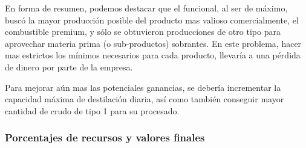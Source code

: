 \documentclass[a4paper,10pt]{article}
\begin{document}
En forma de resumen, podemos destacar que el funcional, al ser de m\'aximo, busc\'o la mayor producci\'on posible del producto mas valioso comercialmente, el combustible premium, y s\'olo se obtuvieron producciones de otro tipo para aprovechar materia prima (o sub-productos) sobrantes. En este problema, hacer mas estrictos los m\'inimos necesarios para cada producto, llevar\'ia a una p\'erdida de dinero por parte de la empresa.

Para mejorar a\'un mas las potenciales ganancias, se deber\'ia incrementar la capacidad m\'axima de destilaci\'on diaria, as\'i como tambi\'en conseguir mayor cantidad de crudo de tipo 1 para su procesado. 

\subsubsection{Porcentajes de recursos y valores finales}
\vspace{1cm}
\end{document}
